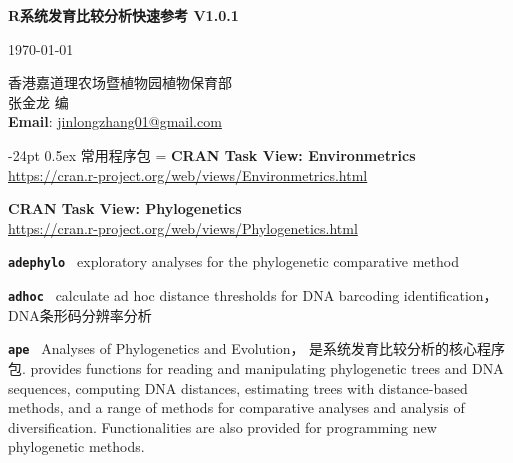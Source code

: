 \documentclass[10pt,landscape]{article}
\makeatletter
\renewcommand\section{\@startsection{section}{1}{0mm}%
                                     {-24pt}%
                                     {0.5ex}%
                                {\color{blue}\normalfont\large\bfseries}}
\newcommand{\bcode}[1]{\texttt{\textbf{#1}}}
\makeatother
\begin{document}
\begin{CJK}{UTF8}{gbsn}
\footnotesize
\begin{multicols}{3}

\setlength{\premulticols}{1pt}
\setlength{\postmulticols}{1pt}
\setlength{\multicolsep}{1pt}
\setlength{\columnsep}{2pt}

\begin{center}
     \Large{\textbf{\color{blue}R系统发育比较分析快速参考 V1.0.1}} \\
\end{center}

\begin{center} 
     {\today{}}\\
\end{center}

香港嘉道理农场暨植物园植物保育部\\

张金龙 编\\
\textbf{Email}: \href{mailto:jinlongzhang01@gmail.com}{jinlongzhang01@gmail.com}

\section{常用程序包}
\everypar={\hangindent=9mm}
\textbf{CRAN Task View: Environmetrics }\\
\href{https://cran.r-project.org/web/views/Environmetrics.html}{
https://cran.r-project.org/web/views/Environmetrics.html
}

\textbf{CRAN Task View: Phylogenetics }\\
\href{https://cran.r-project.org/web/views/Phylogenetics.html}{
https://cran.r-project.org/web/views/Phylogenetics.html
}

\bcode{adephylo       } exploratory analyses for the phylogenetic comparative method

\bcode{adhoc          } calculate ad hoc distance thresholds for DNA barcoding identification， DNA条形码分辨率分析

\bcode{ape            } Analyses of Phylogenetics and Evolution， 是系统发育比较分析的核心程序包. provides functions for reading and manipulating phylogenetic trees and DNA sequences, computing DNA distances, estimating trees with distance-based methods, and a range of methods for comparative analyses and analysis of diversification. Functionalities are also provided for programming new phylogenetic methods.


\end{multicols}
\end{CJK}
\end{document}
